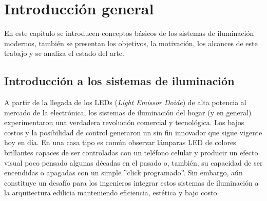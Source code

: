
\chapter{Introducción general} %

\label{Chapter1} %
\label{IntroGeneral}

En este capítulo se introducen conceptos básicos de los sistemas de iluminación modernos, también se presentan los objetivos, la motivación, los alcances de este trabajo y se analiza el estado del arte.


\newcommand{\keyword}[1]{\textbf{#1}}
\newcommand{\tabhead}[1]{\textbf{#1}}
\newcommand{\code}[1]{\texttt{#1}}
\newcommand{\file}[1]{\texttt{\bfseries#1}}
\newcommand{\option}[1]{\texttt{\itshape#1}}
\newcommand{\grados}{$^{\circ}$}



\section{Introducción a los sistemas de iluminación}

A partir de la llegada de los LEDs ({\it{Light Emissor Doide}}) de alta potencia al mercado de la electrónica, los sistemas de iluminación del hogar (y en general) experimentaron una verdadera revolución comercial y tecnológica. Los bajos costos y la posibilidad de control generaron un sin fin innovador que sigue vigente hoy en día. En una casa tipo es común observar lámparas LED de colores brillantes capaces de ser controladas con un teléfono celular y producir un efecto visual poco pensado algunas décadas en el pasado o, también, su capacidad de ser encendidas o apagadas con un simple ''click programado''. Sin embargo, aún constituye un desafío para los ingenieros integrar estos sistemas de iluminación a la arquitectura edilicia manteniendo eficiencia, estética y bajo costo.

